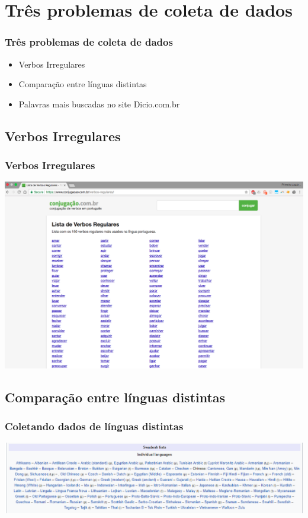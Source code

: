 \documentclass{beamer}
\begin{document}
\section{Três problemas de coleta de dados} %

\begin{frame}
\frametitle{Três problemas de coleta de dados}
\begin{itemize}
\item Verbos Irregulares\\
\item Comparação entre línguas distintas\\
\item Palavras mais buscadas no site Dicio.com.br\\
\end{itemize}
\end{frame}

\subsection{Verbos Irregulares}
\begin{frame}
\frametitle{Verbos Irregulares}
\includegraphics[width=\textwidth]{Screen_Shot_2017-10-05_at_21_21_15.png}
\end{frame}

\subsection{Comparação entre línguas distintas}
\begin{frame}
\frametitle{Coletando dados de línguas distintas}
\includegraphics[width=\textwidth]{ListaDeQuadros.png}
\end{frame}
\end{document}
